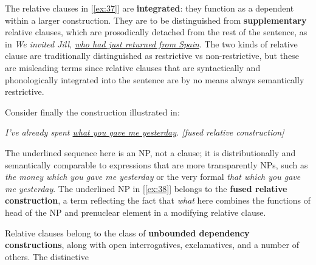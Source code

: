 The relative clauses in [\ref{ex:37}] are \textbf{integrated}: they function as a dependent within a larger construction. They are to be distinguished from \textbf{supplementary} relative clauses, which are prosodically detached from the rest of the sentence, as in \textit{We invited Jill, \uline{who had just returned from Spain}}. The two kinds of relative clause are traditionally distinguished as restrictive vs non-restrictive, but these are misleading terms since relative clauses that are syntactically and phonologically integrated into the sentence are by no means always semantically restrictive.

Consider finally the construction illustrated in:
\begin{examples}
    \item \label{ex:38} \itshape I've already spent \uline{what you gave me yesterday}. \hfill \textnormal{[fused relative construction]}
\end{examples}

The underlined sequence here is an NP, not a clause; it is distributionally and semantically comparable to expressions that are more transparently NPs, such as \textit{the money which you gave me yesterday} or the very formal \textit{that which you gave me yesterday}. The underlined NP in [\ref{ex:38}] belongs to the \textbf{fused relative construction}, a term reflecting the fact that \textit{what} here combines the functions of head of the NP and prenuclear element in a modifying relative clause.

Relative clauses belong to the class of \textbf{unbounded dependency constructions}, along with open interrogatives, exclamatives, and a number of others. The distinctive 

\newpage


